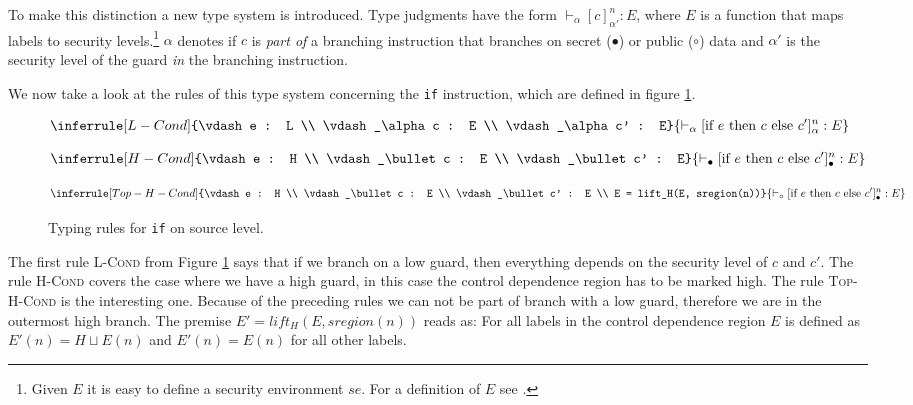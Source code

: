 \documentclass[a4paper,10pt]{llncs}
\begin{document}
To make this distinction a new type system is introduced. Type judgments have the form
$\vdash_\alpha [c]_{\alpha'}^n : E$, where $E$ is a function that maps labels to security
levels.\footnote{Given $E$ it is easy to define a security environment $se$. For a definition
of $E$ see \cite{Barthe06}.} $\alpha$ denotes if $c$ is \textit{part of} a branching
instruction that branches on secret ($\bullet$) or public ($\circ$) data and $\alpha'$ is the
security level of the guard \textit{in} the branching instruction.

We now take a look at the rules of this type system concerning the \texttt{if} instruction, which are
defined in figure \ref{fig:typing-rules-if}.

\begin{figure}
\begin{minipage}{.5\textwidth}
\begin{align*}
\inferrule[L-Cond]{\vdash e : L \\ \vdash_\alpha c : E \\ \vdash_\alpha c' : E}
{\vdash_\alpha [\text{if} \ e \ \text{then} \ c \ \text{else} \ c']^n_\alpha : E}
\end{align*}
\end{minipage}
\begin{minipage}{.5\textwidth}
\begin{align*}
\inferrule[H-Cond]{\vdash e : H \\ \vdash_\bullet c : E \\ \vdash_\bullet c' : E}
{\vdash_\bullet [\text{if} \ e \ \text{then} \ c \ \text{else} \ c']^n_\bullet : E}
\end{align*}
\end{minipage}

\begin{align*}
\inferrule[Top-H-Cond]{\vdash e : H \\ \vdash_\bullet c : E \\
\vdash_\bullet c' : E \\ E = lift_H(E, sregion(n))}
{\vdash_\circ [\text{if} \ e \ \text{then} \ c \ \text{else} \ c']^n_\bullet : E}
\end{align*}
\caption{Typing rules for \texttt{if} on source level.}
\label{fig:typing-rules-if}
\end{figure}

The first rule \textsc{L-Cond} from Figure \ref{fig:typing-rules-if} says that if we branch on a low
guard, then everything depends on the security level of $c$ and $c'$. The rule \textsc{H-Cond} covers the
case where we have a high guard, in this case the control dependence region has to be marked
high. The rule \textsc{Top-H-Cond} is the interesting one. Because of the preceding rules we can not
be part of branch with a low guard, therefore we are in the outermost high branch. The premise
$E' = lift_H(E, sregion(n))$ reads as: For all labels in the control dependence region $E$ is
defined as $E'(n) = H \sqcup E(n)$ and $E'(n) = E(n)$ for all other labels.
\end{document}
